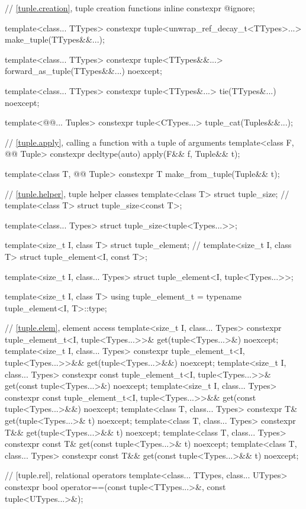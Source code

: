 \documentclass{wg21}
\begin{document}
\begin{codeblock}

// \ref{tuple.creation}, tuple creation functions
inline constexpr @\unspec@ ignore;

template<class... TTypes>
constexpr tuple<unwrap_ref_decay_t<TTypes>...> make_tuple(TTypes&&...);

template<class... TTypes>
constexpr tuple<TTypes&&...> forward_as_tuple(TTypes&&...) noexcept;

template<class... TTypes>
constexpr tuple<TTypes&...> tie(TTypes&...) noexcept;

template<@@... Tuples>
constexpr tuple<CTypes...> tuple_cat(Tuples&&...);

// \ref{tuple.apply}, calling a function with a tuple of arguments
template<class F, @@ Tuple>
constexpr decltype(auto) apply(F&& f, Tuple&& t);

template<class T, @@ Tuple>
constexpr T make_from_tuple(Tuple&& t);

// \ref{tuple.helper}, tuple helper classes
template<class T> struct tuple_size;                  // \notdef
template<class T> struct tuple_size<const T>;

template<class... Types> struct tuple_size<tuple<Types...>>;

template<size_t I, class T> struct tuple_element;     // \notdef
template<size_t I, class T> struct tuple_element<I, const T>;

template<size_t I, class... Types>
struct tuple_element<I, tuple<Types...>>;

template<size_t I, class T>
using tuple_element_t = typename tuple_element<I, T>::type;

// \ref{tuple.elem}, element access
template<size_t I, class... Types>
constexpr tuple_element_t<I, tuple<Types...>>& get(tuple<Types...>&) noexcept;
template<size_t I, class... Types>
constexpr tuple_element_t<I, tuple<Types...>>&& get(tuple<Types...>&&) noexcept;
template<size_t I, class... Types>
constexpr const tuple_element_t<I, tuple<Types...>>& get(const tuple<Types...>&) noexcept;
template<size_t I, class... Types>
constexpr const tuple_element_t<I, tuple<Types...>>&& get(const tuple<Types...>&&) noexcept;
template<class T, class... Types>
constexpr T& get(tuple<Types...>& t) noexcept;
template<class T, class... Types>
constexpr T&& get(tuple<Types...>&& t) noexcept;
template<class T, class... Types>
constexpr const T& get(const tuple<Types...>& t) noexcept;
template<class T, class... Types>
constexpr const T&& get(const tuple<Types...>&& t) noexcept;

// [tuple.rel], relational operators
template<class... TTypes, class... UTypes>
constexpr bool operator==(const tuple<TTypes...>&, const tuple<UTypes...>&);\end{codeblock}
\end{document}
